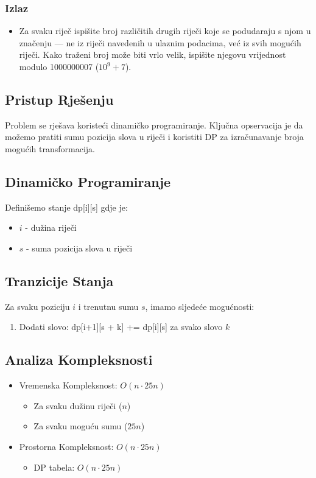 \subsubsection{Izlaz}
\begin{itemize}
    \item Za svaku riječ ispišite broj različitih drugih riječi koje se podudaraju s njom u značenju — ne iz riječi navedenih u ulaznim podacima, već iz svih mogućih riječi. Kako traženi broj može biti vrlo velik, ispišite njegovu vrijednost modulo 1000000007 ($10^9 + 7$).
\end{itemize}

\subsection{Pristup Rješenju}
Problem se rješava koristeći dinamičko programiranje. Ključna opservacija je da možemo pratiti sumu pozicija slova u riječi i koristiti DP za izračunavanje broja mogućih transformacija.

\subsection{Dinamičko Programiranje}
Definišemo stanje dp[i][s] gdje je:
\begin{itemize}
    \item $i$ - dužina riječi
    \item $s$ - suma pozicija slova u riječi
\end{itemize}

\subsection{Tranzicije Stanja}
Za svaku poziciju $i$ i trenutnu sumu $s$, imamo sljedeće mogućnosti:
\begin{enumerate}
    \item Dodati slovo: dp[i+1][s + k] += dp[i][s] za svako slovo $k$
\end{enumerate}

\subsection{Analiza Kompleksnosti}
\begin{itemize}
    \item Vremenska Kompleksnost: $O(n \cdot 25n)$
        \begin{itemize}
            \item Za svaku dužinu riječi ($n$)
            \item Za svaku moguću sumu ($25n$)
        \end{itemize}
    \item Prostorna Kompleksnost: $O(n \cdot 25n)$
        \begin{itemize}
            \item DP tabela: $O(n \cdot 25n)$
        \end{itemize}
\end{itemize}

